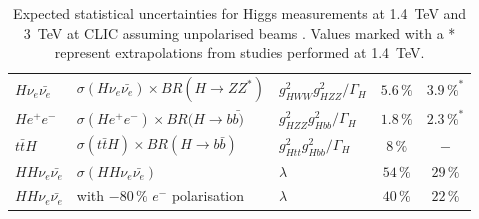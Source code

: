\begin{table}
\begin{tabular}{lllcc}
    $H\nu_e\bar{\nu_e}$    & $\sigma(H\nu_e\bar{\nu_e})\times BR(H\rightarrow ZZ^*)$         & $g^{2}_{HWW}g_{HZZ}^{2}/\Gamma_H$  & $5.6\,\%$ & $3.9\,\%^*$   \\
    $He^+e^-$       & $\sigma(He^+e^-)\times BR(H\rightarrow b\bar{b)}$           & $g_{HZZ}^{2}g_{Hbb}^{2}/\Gamma_H$    & $1.8\,\%$ & $2.3\,\%^*$ \\ \midrule
    $t\bar{t}H$      & $\sigma(t\bar{t}H)\times BR(H\rightarrow b\bar{b})$          & $g_{Htt}^{2}g_{Hbb}^{2}/\Gamma_H$  & $8\,\%$         & $-$             \\
    $HH\nu_e\bar{\nu_e}$ & $\sigma(HH\nu_e\bar{\nu_e})$                               & $\lambda$                   & $54\,\%$          & $29\,\%$            \\
    $HH\nu_e\bar{\nu_e}$ & with $-80\,\%$ $e^-$ polarisation                             & $\lambda$                  & $40\,\%$          & $22\,\%$            \\ \bottomrule
  \end{tabular}
  \caption[Expected statistical uncertainties for Higgs measurements at 1.4~TeV and 3~TeV at CLIC assuming unpolarised beams]{Expected statistical uncertainties for Higgs measurements at 1.4~TeV and 3~TeV at CLIC assuming unpolarised beams \cite{Abramowicz:2016zbo}. Values marked with a * represent extrapolations from studies performed at 1.4~TeV.}
  \label{fig:HighENumbers}
\end{table}

